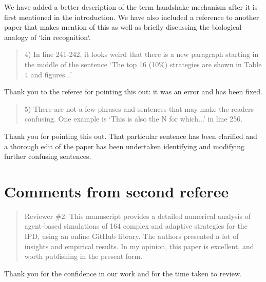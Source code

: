 \documentclass[a4]{article}
\begin{document}
We have added a better description of the term handshake mechanism after it is
first mentioned in the introduction. We have also included a reference to
another paper that makes mention of this as well as briefly discussing the
biological analogy of `kin recognition`.

\begin{quote}
  4) In line 241-242, it looks weird that there is a new paragraph starting in
  the middle of the sentence `The top 16 (10\%) strategies are shown in Table 4
  and figures...'
\end{quote}

Thank you to the referee for pointing this out: it was an error and has been
fixed.

\begin{quote}
  5) There are not a few phrases and sentences that may make the readers
  confusing. One example is `This is also the N for which...' in line 256.
\end{quote}

Thank you for pointing this out. That particular sentence has been clarified and
a thorough edit of the paper has been undertaken identifying and modifying
further confusing sentences.

\section{Comments from second referee}


\begin{quote}
  Reviewer \#2: This manuscript provides a detailed numerical analysis of
  agent-based simulations of 164 complex and adaptive strategies for the IPD,
  using an online GitHub library. The authors presented a lot of insights and
  empirical results. In my opinion, this paper is excellent, and worth publishing
  in the present form.
\end{quote}

Thank you for the confidence in our work and for the time taken to review.
\end{document}
